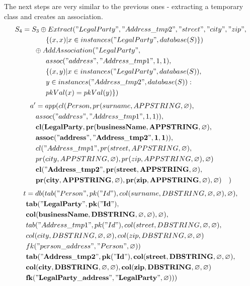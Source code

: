 \documentclass[11pt]{article}
\begin{document}
\newpage
The next steps are very similar to the previous ones - extracting a temporary class and creates an association.
\begin{align*}
S_4 &= S_3 \oplus Extract("LegalParty", "Address\_tmp2", "street", "city", "zip",\\ 
& \;\;\;\;\;\; \;\;\;\;\;\;  \{(x,x) | x \in instances("LegalParty", database(S)\}) \\
& \;\;\;\;\;\; \oplus AddAssociation("LegalParty", \\ 
& \;\;\;\;\;\;\;\;\;\;\;\; assoc("address", "Address\_tmp1", 1, 1),\\ 
& \;\;\;\;\;\;\;\;\;\;\;\; \{(x,y)| x \in instances("LegalParty", database(S)), \\
& \;\;\;\;\;\; \;\;\;\;\;\; y \in instances("Address\_tmp2", database(S)) : \\ 
& \;\;\;\;\;\;\;\;\;\;\;\; pkVal(x) = pkVal(y) \})\end{align*}
\hline
\begin{align*}
a' &=app(cl(Person, pr(surname, APPSTRING, \varnothing), \\ 
& assoc("address", "Address\_tmp1", 1, 1)), \\ 
& \mathbf{cl(LegalParty, pr(businessName, APPSTRING, \varnothing)},\\
& \mathbf{assoc("address", "Address\_tmp2", 1, 1))}, \\
& cl("Address\_tmp1", pr(street, APPSTRING, \varnothing), \\
& pr(city, APPSTRING, \varnothing), pr(zip, APPSTRING, \varnothing), \varnothing) \\
& \mathbf{cl("Address\_tmp2", pr(street, APPSTRING, \varnothing)}, \\
& \mathbf{pr(city, APPSTRING, \varnothing), pr(zip, APPSTRING, \varnothing), \varnothing)}
& )
\end{align*}
\begin{align*}
t &=db(tab("Person", pk("Id"), col(surname, DBSTRING, \varnothing, \varnothing), \varnothing), \\
& \mathbf{tab("LegalParty", pk("Id"), } \\
& \mathbf{col(businessName, DBSTRING, \varnothing, \varnothing), \varnothing),} \\
& tab("Address\_tmp1", pk("Id"), col(street, DBSTRING, \varnothing, \varnothing),\\
& col(city, DBSTRING, \varnothing, \varnothing), col(zip, DBSTRING, \varnothing, \varnothing) \\
& fk("person\_address", "Person", \varnothing))\\
& \mathbf{tab("Address\_tmp2", pk("Id"), col(street, DBSTRING, \varnothing, \varnothing)},\\
& \mathbf{col(city, DBSTRING, \varnothing, \varnothing), col(zip, DBSTRING, \varnothing, \varnothing)} \\
& \mathbf{fk("LegalParty\_address", "LegalParty", \varnothing))}) 
\end{align*}
\end{document}
